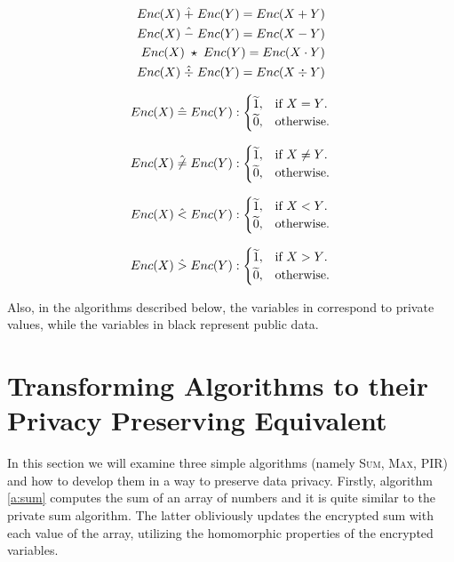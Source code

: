 \begin{equation}\label{eq:operands}
  \begin{aligned}
      Enc(X) \;\hat{+}\; Enc(Y) = Enc(X + Y)\\
      Enc(X) \;\hat{-}\; Enc(Y) = Enc(X - Y)\\
      Enc(X) \;\star\; Enc(Y) = Enc(X \cdot Y)\\
      Enc(X) \;\hat{\div}\; Enc(Y) = Enc(X \div Y)
  \end{aligned}
\end{equation}

\begin{equation}\label{eq:equal}
  Enc(X) \;\hat{=}\; Enc(Y) :\begin{cases}
    \widetilde{1}, & \text{if $X = Y$}.\\
    \widetilde{0}, & \text{otherwise}.
  \end{cases}
\end{equation}

\begin{equation}\label{eq:not-equal}
  Enc(X) \;\hat{\neq}\; Enc(Y) :\begin{cases}
    \widetilde{1}, & \text{if $X \neq Y$}.\\
    \widetilde{0}, & \text{otherwise}.
  \end{cases}
\end{equation}

\begin{equation}\label{eq:lt}
  Enc(X) \;\hat{<}\; Enc(Y) :\begin{cases}
    \widetilde{1}, & \text{if $X < Y$}.\\
    \widetilde{0}, & \text{otherwise}.
  \end{cases}
\end{equation}

\begin{equation}\label{eq:gt}
  Enc(X) \;\hat{>}\; Enc(Y) :\begin{cases}
    \widetilde{1}, & \text{if $X > Y$}.\\
    \widetilde{0}, & \text{otherwise}.
  \end{cases}
\end{equation}

Also, in the algorithms described below, the variables in  correspond to private values, while the variables in black represent public data.


\section{Transforming Algorithms to their Privacy Preserving Equivalent}\label{s:simple-algorithms}
In this section we will examine three simple algorithms (namely {\textsc{Sum}, \textsc{Max}, \textsc{PIR}}) and how to develop them in a way to preserve data privacy.
Firstly, algorithm \ref{a:sum} computes the sum of an array of numbers and it is quite similar to the private sum algorithm.
The latter obliviously updates the encrypted sum with each value of the array, utilizing the homomorphic properties of the encrypted variables.

